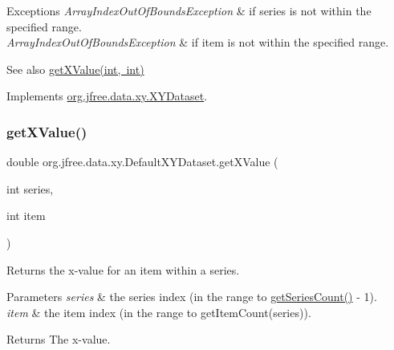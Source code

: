 \begin{DoxyExceptions}{Exceptions}
{\em Array\+Index\+Out\+Of\+Bounds\+Exception} & if {\ttfamily series} is not within the specified range. \\
\hline
{\em Array\+Index\+Out\+Of\+Bounds\+Exception} & if {\ttfamily item} is not within the specified range.\\
\hline
\end{DoxyExceptions}
\begin{DoxySeeAlso}{See also}
\mbox{\hyperlink{classorg_1_1jfree_1_1data_1_1xy_1_1_default_x_y_dataset_a8b2261dd2265af0d085c4889ae519521}{get\+X\+Value(int, int)}} 
\end{DoxySeeAlso}


Implements \mbox{\hyperlink{interfaceorg_1_1jfree_1_1data_1_1xy_1_1_x_y_dataset_a85c75ba5b69b551e96afd29d1732ba22}{org.\+jfree.\+data.\+xy.\+X\+Y\+Dataset}}.

\mbox{\label{classorg_1_1jfree_1_1data_1_1xy_1_1_default_x_y_dataset_a8b2261dd2265af0d085c4889ae519521}} 
\subsubsection{\texorpdfstring{get\+X\+Value()}{getXValue()}}
{\footnotesize\ttfamily double org.\+jfree.\+data.\+xy.\+Default\+X\+Y\+Dataset.\+get\+X\+Value (\begin{DoxyParamCaption}\item[{int}]{series,  }\item[{int}]{item }\end{DoxyParamCaption})}

Returns the x-\/value for an item within a series.


\begin{DoxyParams}{Parameters}
{\em series} & the series index (in the range {} to {\ttfamily \mbox{\hyperlink{classorg_1_1jfree_1_1data_1_1xy_1_1_default_x_y_dataset_a0e11a4936eb729adf611cb44013abc5b}{get\+Series\+Count()}} -\/ 1}). \\
\hline
{\em item} & the item index (in the range {} to {\ttfamily get\+Item\+Count(series)}).\\
\hline
\end{DoxyParams}
\begin{DoxyReturn}{Returns}
The x-\/value.
\end{DoxyReturn}

